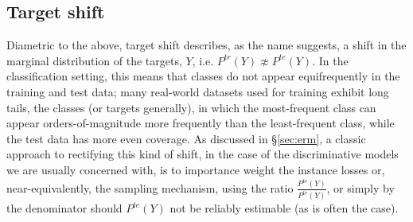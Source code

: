\subsection{Target shift}\label{ssec:label-shift}
Diametric to the above, target shift describes, as the name suggests, a shift in the marginal
distribution of the targets, \(Y\), i.e. \( P^{tr}(Y) \not\approx P^{te}(Y) \).
%
In the classification setting, this means that classes do not appear equifrequently in the training
and test data; many real-world datasets used for training exhibit long tails, \wrt{} the classes
(or targets generally), in which the most-frequent class can appear orders-of-magnitude more
frequently than the least-frequent class, while the test data has more even coverage.
%
As discussed in \S\ref{sec:erm}, a classic approach to rectifying this kind of shift, in the case
of the discriminative models we are usually concerned with, is to importance weight the instance
losses or, near-equivalently, the sampling mechanism, using the ratio \(\frac{P^{te}(Y)}{P^{tr}(Y)}
\), or simply by the denominator should \( P^{te}(Y)\) not be reliably estimable (as is often the
case).
%
%
